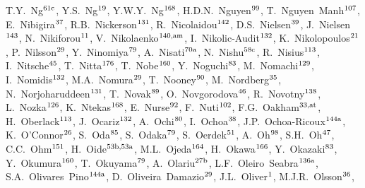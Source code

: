 \begin{flushleft}
T.Y.~Ng$^\textrm{\scriptsize 61c}$,    
Y.S.~Ng$^\textrm{\scriptsize 19}$,    
Y.W.Y.~Ng$^\textrm{\scriptsize 168}$,    
H.D.N.~Nguyen$^\textrm{\scriptsize 99}$,    
T.~Nguyen~Manh$^\textrm{\scriptsize 107}$,    
E.~Nibigira$^\textrm{\scriptsize 37}$,    
R.B.~Nickerson$^\textrm{\scriptsize 131}$,    
R.~Nicolaidou$^\textrm{\scriptsize 142}$,    
D.S.~Nielsen$^\textrm{\scriptsize 39}$,    
J.~Nielsen$^\textrm{\scriptsize 143}$,    
N.~Nikiforou$^\textrm{\scriptsize 11}$,    
V.~Nikolaenko$^\textrm{\scriptsize 140,am}$,    
I.~Nikolic-Audit$^\textrm{\scriptsize 132}$,    
K.~Nikolopoulos$^\textrm{\scriptsize 21}$,    
P.~Nilsson$^\textrm{\scriptsize 29}$,    
Y.~Ninomiya$^\textrm{\scriptsize 79}$,    
A.~Nisati$^\textrm{\scriptsize 70a}$,    
N.~Nishu$^\textrm{\scriptsize 58c}$,    
R.~Nisius$^\textrm{\scriptsize 113}$,    
I.~Nitsche$^\textrm{\scriptsize 45}$,    
T.~Nitta$^\textrm{\scriptsize 176}$,    
T.~Nobe$^\textrm{\scriptsize 160}$,    
Y.~Noguchi$^\textrm{\scriptsize 83}$,    
M.~Nomachi$^\textrm{\scriptsize 129}$,    
I.~Nomidis$^\textrm{\scriptsize 132}$,    
M.A.~Nomura$^\textrm{\scriptsize 29}$,    
T.~Nooney$^\textrm{\scriptsize 90}$,    
M.~Nordberg$^\textrm{\scriptsize 35}$,    
N.~Norjoharuddeen$^\textrm{\scriptsize 131}$,    
T.~Novak$^\textrm{\scriptsize 89}$,    
O.~Novgorodova$^\textrm{\scriptsize 46}$,    
R.~Novotny$^\textrm{\scriptsize 138}$,    
L.~Nozka$^\textrm{\scriptsize 126}$,    
K.~Ntekas$^\textrm{\scriptsize 168}$,    
E.~Nurse$^\textrm{\scriptsize 92}$,    
F.~Nuti$^\textrm{\scriptsize 102}$,    
F.G.~Oakham$^\textrm{\scriptsize 33,at}$,    
H.~Oberlack$^\textrm{\scriptsize 113}$,    
J.~Ocariz$^\textrm{\scriptsize 132}$,    
A.~Ochi$^\textrm{\scriptsize 80}$,    
I.~Ochoa$^\textrm{\scriptsize 38}$,    
J.P.~Ochoa-Ricoux$^\textrm{\scriptsize 144a}$,    
K.~O'Connor$^\textrm{\scriptsize 26}$,    
S.~Oda$^\textrm{\scriptsize 85}$,    
S.~Odaka$^\textrm{\scriptsize 79}$,    
S.~Oerdek$^\textrm{\scriptsize 51}$,    
A.~Oh$^\textrm{\scriptsize 98}$,    
S.H.~Oh$^\textrm{\scriptsize 47}$,    
C.C.~Ohm$^\textrm{\scriptsize 151}$,    
H.~Oide$^\textrm{\scriptsize 53b,53a}$,    
M.L.~Ojeda$^\textrm{\scriptsize 164}$,    
H.~Okawa$^\textrm{\scriptsize 166}$,    
Y.~Okazaki$^\textrm{\scriptsize 83}$,    
Y.~Okumura$^\textrm{\scriptsize 160}$,    
T.~Okuyama$^\textrm{\scriptsize 79}$,    
A.~Olariu$^\textrm{\scriptsize 27b}$,    
L.F.~Oleiro~Seabra$^\textrm{\scriptsize 136a}$,    
S.A.~Olivares~Pino$^\textrm{\scriptsize 144a}$,    
D.~Oliveira~Damazio$^\textrm{\scriptsize 29}$,    
J.L.~Oliver$^\textrm{\scriptsize 1}$,    
M.J.R.~Olsson$^\textrm{\scriptsize 36}$,    

\end{flushleft}
